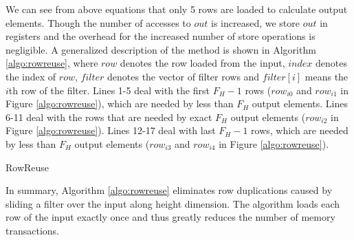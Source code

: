We can see from above equations that only 5 rows are loaded to calculate output elements. {\color{red}Though the number of accesses to $out$ is increased, we store $out$ in registers and the overhead for the increased number of store operations is negligible.} A generalized description of the method is
shown in Algorithm \ref{algo:rowreuse}, where $row$ denotes the row loaded from the input, $index$ denotes the index of $row$, $filter$ denotes
the vector of filter rows and $filter[i]$ means the $i$th row of the filter. Lines 1-5 deal with the first $F_H-1$ rows ($row_{i0}$ and $row_{i1}$ in Figure \ref{algo:rowreuse}), which
are needed by less than $F_H$ output elements. Lines 6-11 deal with the rows that are needed by exact $F_H$ output elements ($row_{i2}$ in
Figure \ref{algo:rowreuse}). Lines 12-17 deal with last $F_H-1$ rows, which are needed by less than $F_H$ output elements ($row_{i3}$
and $row_{i4}$ in Figure \ref{algo:rowreuse}).

\begin{algorithm}
	\caption{RowReuse}
	\label{algo:rowreuse}
\end{algorithm}

In summary, Algorithm \ref{algo:rowreuse} eliminates row duplications caused by sliding a filter over the input along height dimension. The
algorithm loads each row of the input exactly once and thus greatly reduces the number of memory transactions.
